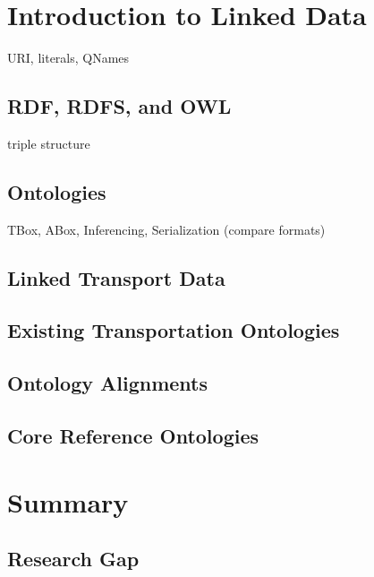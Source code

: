 
\section{Introduction to Linked Data}
URI, literals, QNames
\subsection{RDF, RDFS, and OWL}
triple structure
\subsection{Ontologies}
TBox, ABox, Inferencing, Serialization (compare formats)
\subsection{Linked Transport Data}
\subsection{Existing Transportation Ontologies}
\subsection{Ontology Alignments}
\subsection{Core Reference Ontologies}

\section{Summary}
\subsection{Research Gap}

